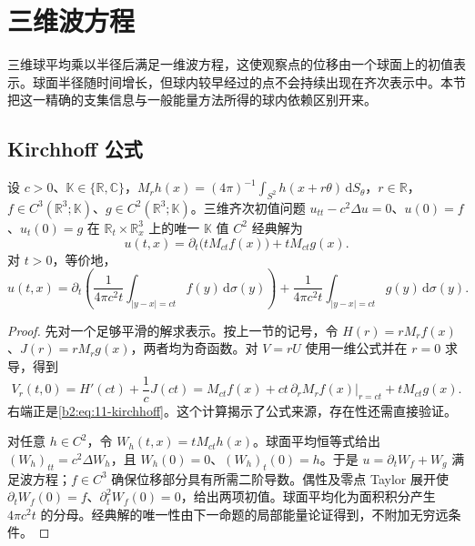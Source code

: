 \section{三维波方程}
\label{b2:sec:1102}

三维球平均乘以半径后满足一维波方程，这使观察点的位移由一个球面上的初值表示。球面半径随时间增长，但球内较早经过的点不会持续出现在齐次表示中。本节把这一精确的支集信息与一般能量方法所得的球内依赖区别开来。

\subsection{Kirchhoff 公式}
\label{b2:subsec:110201}

\begin{theorem}[Kirchhoff]\label{b2:thm:11-kirchhoff}
设 \(c>0\)、\(\mathbb K\in\{\mathbb R,\mathbb C\}\)，\(M_rh(x)=(4\pi)^{-1}\int_{S^2}h(x+r\theta)\,\mathrm dS_\theta\)，\(r\in\mathbb R\)，\(f\in C^3(\mathbb R^3;\mathbb K)\)、\(g\in C^2(\mathbb R^3;\mathbb K)\)。三维齐次初值问题 \(u_{tt}-c^2\Delta u=0\)、\(u(0)=f\)、\(u_t(0)=g\) 在 \(\mathbb R_t\times\mathbb R_x^3\) 上的唯一 \(\mathbb K\) 值 \(C^2\) 经典解为
\begin{equation}\label{b2:eq:11-kirchhoff}
 u(t,x)=\partial_t\bigl(tM_{ct}f(x)\bigr)+tM_{ct}g(x).
\end{equation}
对 \(t>0\)，等价地，
\[
 u(t,x)=\partial_t\left(\dfrac1{4\pi c^2t}
       \int_{|y-x|=ct}f(y)\,\mathrm{d}\sigma(y)\right)
       +\dfrac1{4\pi c^2t}\int_{|y-x|=ct}g(y)\,\mathrm{d}\sigma(y).
\]
\end{theorem}
\begin{proof}
先对一个足够平滑的解求表示。按上一节的记号，令 \(H(r)=rM_rf(x)\)、\(J(r)=rM_rg(x)\)，两者均为奇函数。对 \(V=rU\) 使用一维公式并在 \(r=0\) 求导，得到
\[
 V_r(t,0)=H'(ct)+\dfrac1cJ(ct)
 =M_{ct}f(x)+ct\,\partial_rM_rf(x)|_{r=ct}+tM_{ct}g(x).
\]
右端正是\eqref{b2:eq:11-kirchhoff}。这个计算揭示了公式来源，存在性还需直接验证。

对任意 \(h\in C^2\)，令 \(W_h(t,x)=tM_{ct}h(x)\)。球面平均恒等式给出 \((W_h)_{tt}=c^2\Delta W_h\)，且 \(W_h(0)=0\)、\((W_h)_t(0)=h\)。于是 \(u=\partial_tW_f+W_g\) 满足波方程；\(f\in C^3\) 确保位移部分具有所需二阶导数。偶性及零点 Taylor 展开使 \(\partial_tW_f(0)=f\)、\(\partial_t^2W_f(0)=0\)，给出两项初值。球面平均化为面积积分产生 \(4\pi c^2t\) 的分母。经典解的唯一性由下一命题的局部能量论证得到，不附加无穷远条件。
\end{proof}

